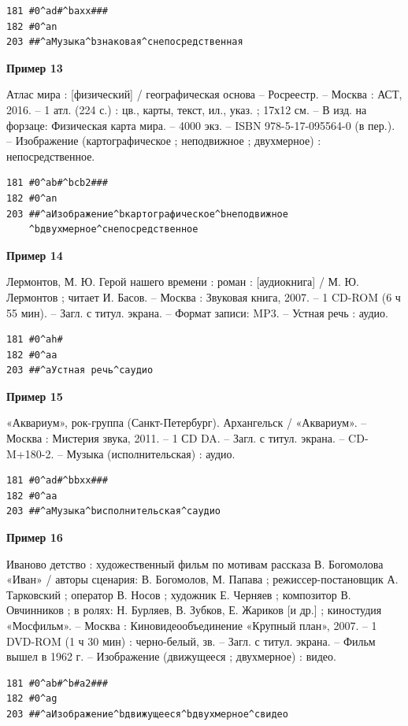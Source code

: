 \begin{verbatim}
181 #0^ad#^baxx###
182 #0^an
203 ##^aМузыка^bзнаковая^cнепосредственная
\end{verbatim}

\textbf{Пример 13}

Атлас мира : [физический] / географическая основа – Росреестр. – Москва : АСТ, 2016. – 1 атл. (224 с.) : цв., карты, текст, ил., указ. ; 17х12 см. – В изд. на форзаце: Физическая карта мира. – 4000 экз. – ISBN 978-5-17-095564-0 (в пер.). – Изображение (картографическое ; неподвижное ; двухмерное) : непосредственное.

\begin{verbatim}
181 #0^ab#^bcb2###
182 #0^an
203 ##^aИзображение^bкартографическое^bнеподвижное
    ^bдвухмерное^cнепосредственное
\end{verbatim}

\textbf{Пример 14}

Лермонтов, М. Ю. Герой нашего времени : роман : [аудиокнига] / М. Ю. Лермонтов ; читает И. Басов. – Москва : Звуковая книга, 2007. – 1 CD-ROM (6 ч 55 мин). – Загл. с титул. экрана. – Формат записи: MP3. – Устная речь : аудио.

\begin{verbatim}
181 #0^ah#
182 #0^aa
203 ##^aУстная речь^cаудио
\end{verbatim}

\textbf{Пример 15}

«Аквариум», рок-группа (Санкт-Петербург). Архангельск / «Аквариум». – Москва : Мистерия звука, 2011. – 1 СD DA. – Загл. с титул. экрана. – CD-M+180-2. – Музыка (исполнительская) : аудио.

\begin{verbatim}
181 #0^ad#^bbxx###
182 #0^aa
203 ##^aМузыка^bисполнительская^cаудио
\end{verbatim}

\textbf{Пример 16}

Иваново детство : художественный фильм по мотивам рассказа В. Богомолова «Иван» / авторы сценария: В. Богомолов, М. Папава ; режиссер-постановщик А. Тарковский ; оператор В. Носов ; художник Е. Черняев ; композитор В. Овчинников ; в ролях: Н. Бурляев, В. Зубков, Е. Жариков [и др.] ; киностудия «Мосфильм». – Москва : Киновидеообъединение «Крупный план», 2007. – 1 DVD-ROM (1 ч 30 мин) : черно-белый, зв. – Загл. с титул. экрана. – Фильм вышел в 1962 г. – Изображение (движущееся ; двухмерное) : видео.

\begin{verbatim}
181 #0^ab#^b#a2###
182 #0^ag
203 ##^aИзображение^bдвижущееся^bдвухмерное^cвидео
\end{verbatim}

